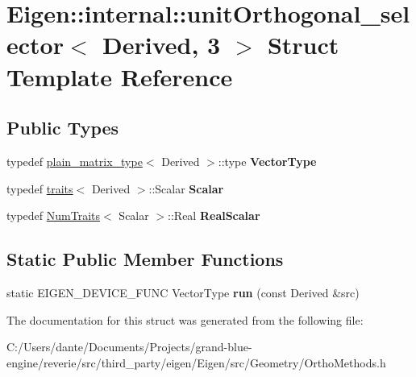 \hypertarget{struct_eigen_1_1internal_1_1unit_orthogonal__selector_3_01_derived_00_013_01_4}{}\section{Eigen\+::internal\+::unit\+Orthogonal\+\_\+selector$<$ Derived, 3 $>$ Struct Template Reference}
\label{struct_eigen_1_1internal_1_1unit_orthogonal__selector_3_01_derived_00_013_01_4}
\subsection*{Public Types}
\begin{DoxyCompactItemize}
\item 
\mbox{\label{struct_eigen_1_1internal_1_1unit_orthogonal__selector_3_01_derived_00_013_01_4_a490c764e96311e88342fec0cf01ef187}} 
typedef \mbox{\hyperlink{struct_eigen_1_1internal_1_1plain__matrix__type}{plain\+\_\+matrix\+\_\+type}}$<$ Derived $>$\+::type {\bfseries Vector\+Type}
\item 
\mbox{\label{struct_eigen_1_1internal_1_1unit_orthogonal__selector_3_01_derived_00_013_01_4_a896fc4aa9d01f63b4a82c1bca43c61f9}} 
typedef \mbox{\hyperlink{struct_eigen_1_1internal_1_1traits}{traits}}$<$ Derived $>$\+::Scalar {\bfseries Scalar}
\item 
\mbox{\label{struct_eigen_1_1internal_1_1unit_orthogonal__selector_3_01_derived_00_013_01_4_a148fa71fd19ee3bd07ec2921a8a087c2}} 
typedef \mbox{\hyperlink{struct_eigen_1_1_num_traits}{Num\+Traits}}$<$ Scalar $>$\+::Real {\bfseries Real\+Scalar}
\end{DoxyCompactItemize}
\subsection*{Static Public Member Functions}
\begin{DoxyCompactItemize}
\item 
\mbox{\label{struct_eigen_1_1internal_1_1unit_orthogonal__selector_3_01_derived_00_013_01_4_ae4934414f579b7264887a98c0db3e3f5}} 
static E\+I\+G\+E\+N\+\_\+\+D\+E\+V\+I\+C\+E\+\_\+\+F\+U\+NC Vector\+Type {\bfseries run} (const Derived \&src)
\end{DoxyCompactItemize}


The documentation for this struct was generated from the following file\+:\begin{DoxyCompactItemize}
\item 
C\+:/\+Users/dante/\+Documents/\+Projects/grand-\/blue-\/engine/reverie/src/third\+\_\+party/eigen/\+Eigen/src/\+Geometry/Ortho\+Methods.\+h\end{DoxyCompactItemize}
